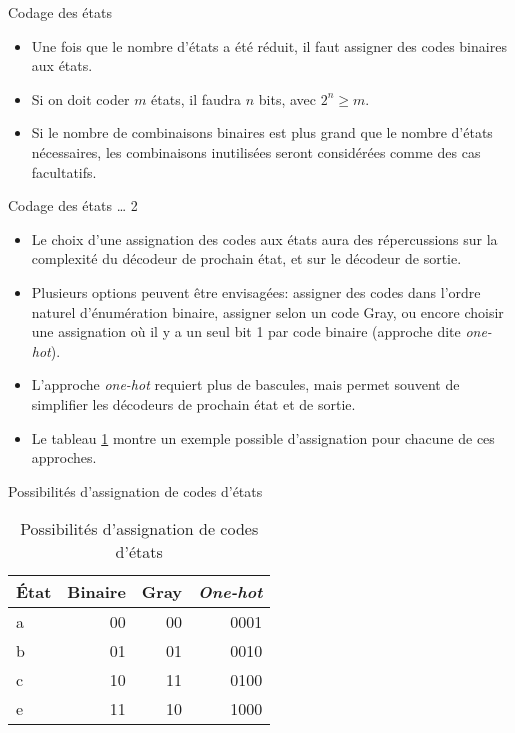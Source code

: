 \documentclass[presentation]{beamer}
\begin{document}
\begin{frame}[label={sec:orgff0756f}]{Codage des états}
\begin{itemize}
\item Une fois que le nombre d'états a été réduit, il faut assigner des codes binaires aux états.

\item Si on doit coder \(m\) états, il faudra \(n\) bits, avec \(2^n \geq m\).

\item Si le nombre de combinaisons binaires est plus grand que le nombre d'états nécessaires, les combinaisons inutilisées seront considérées comme des cas facultatifs.
\end{itemize}
\end{frame}

\begin{frame}[label={sec:org62d9cd8}]{Codage des états \ldots{} 2}
\begin{itemize}
\item Le choix d'une assignation des codes aux états aura des répercussions sur la complexité du décodeur de prochain état, et sur le décodeur de sortie.

\item Plusieurs options peuvent être envisagées: assigner des codes dans l'ordre naturel d'énumération binaire, assigner selon un code Gray, ou encore choisir une assignation où il y a un seul bit 1 par code binaire (approche dite \emph{one-hot}).

\item L'approche \emph{one-hot} requiert plus de bascules, mais permet souvent de simplifier les décodeurs de prochain état et de sortie.

\item Le tableau \ref{tab:org300d0a6} montre un exemple possible d'assignation pour chacune de ces approches.
\end{itemize}
\end{frame}

\begin{frame}[label={sec:org1433631}]{Possibilités d'assignation de codes d'états}
\begin{table}[htbp]
\caption{\label{tab:org300d0a6}Possibilités d'assignation de codes d'états}
\centering
\begin{tabular}{lrrr}
État & Binaire & Gray & \emph{One-hot}\\[0pt]
\hline
a & 00 & 00 & 0001\\[0pt]
b & 01 & 01 & 0010\\[0pt]
c & 10 & 11 & 0100\\[0pt]
e & 11 & 10 & 1000\\[0pt]
\end{tabular}
\end{table}
\end{frame}
\end{document}
